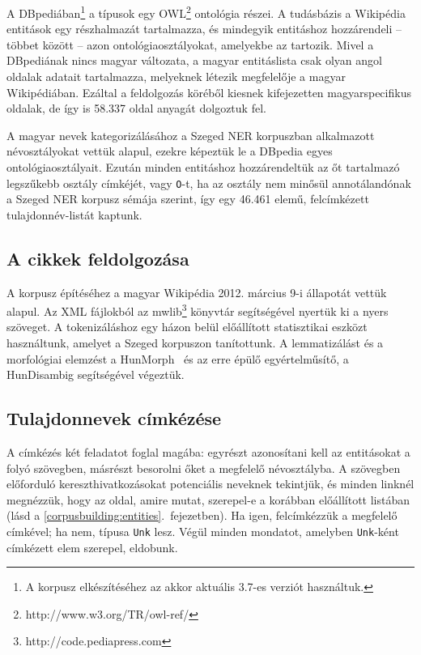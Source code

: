 \documentclass{llncs}
\begin{document}
A DBpediában\footnote{A korpusz elkészítéséhez az akkor aktuális 3.7-es verziót
használtuk.} a típusok egy OWL\footnote{http://www.w3.org/TR/owl-ref/}
ontológia részei. A tudásbázis a Wikipédia entitások egy részhalmazát
tartalmazza, és mindegyik entitáshoz hozzárendeli -- többet között -- azon
ontológiaosztályokat, amelyekbe az tartozik. Mivel a DBpediának nincs magyar változata, 
a magyar entitáslista csak olyan angol oldalak adatait
tartalmazza, melyeknek létezik megfelelője a magyar Wikipédiában. 
Ezáltal a feldolgozás köréből kiesnek kifejezetten magyarspecifikus oldalak, de 
így is 58.337 oldal anyagát dolgoztuk fel. 

A magyar nevek kategorizálásához a Szeged NER \cite{Szarvas:06} korpuszban alkalmazott névosztályokat vettük alapul, ezekre képeztük le a DBpedia egyes ontológiaosztályait. 
Ezután minden entitáshoz hozzárendeltük az őt tartalmazó
legszűkebb osztály címkéjét, vagy \texttt{O}-t, ha az osztály nem minősül annotálandónak a Szeged
NER korpusz sémája szerint, így egy 46.461 elemű, felcímkézett tulajdonnév-listát kaptunk.

\subsection{A cikkek feldolgozása}

A korpusz építéséhez a magyar Wikipédia 2012. március 9-i állapotát vettük
alapul. Az XML fájlokból az mwlib\footnote{http://code.pediapress.com}
könyvtár segítségével nyertük ki a nyers szöveget. 
A tokenizáláshoz egy házon belül előállított statisztikai eszközt használtunk, amelyet a Szeged korpuszon \cite{csendes} tanítottunk. 
A lemmatizálást és a morfológiai elemzést a
HunMorph~\cite{Tron:05} és az erre épülő egyértelműsítő, a HunDisambig
segítségével végeztük. %

\subsection{Tulajdonnevek címkézése}

A címkézés két feladatot foglal magába: egyrészt azonosítani kell az
entitásokat a folyó szövegben, másrészt besorolni őket a megfelelő
névosztályba. 
A szövegben előforduló kereszthivatkozásokat potenciális neveknek tekintjük, és minden
linknél megnézzük, hogy az oldal, amire mutat, szerepel-e a
korábban előállított listában (lásd a \ref{corpusbuilding:entities}.~fejezetben). Ha igen,
felcímkézzük a megfelelő címkével; ha nem, típusa \texttt{Unk} lesz. Végül
minden mondatot, amelyben \texttt{Unk}-ként címkézett elem szerepel, eldobunk.
\end{document}
